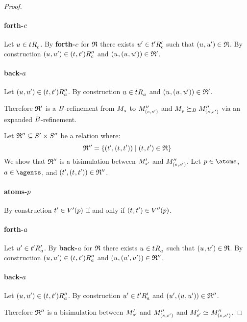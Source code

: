 \begin{proof}
\paragraph{forth-$c$}
Let $\kStateU \in \kSuccessorsC{\kStateT}$.
By {\bf forth-$c$} for $\mathfrak{R}$ there exists ${u}^{\prime} \in {{t}^{\prime}} {R^{\prime}_{c}}$ such that $(\kStateU, \kStateUP) \in \refinement$.
By construction $(\kStateU, \kStateUP) \in \kSuccessorsPPC{(\kStateT, \kStateTP)}$ and $(\kStateU, (\kStateU, \kStateUP)) \in \refinement'$.

\paragraph{back-$a$}
Let $(\kStateU, \kStateUP) \in \kSuccessorsPPA{(\kStateT, \kStateTP)}$.
By construction $\kStateU \in \kSuccessorsA{\kStateT}$ and $(\kStateU, (\kStateU, \kStateUP)) \in \refinement'$.

Therefore $\mathfrak{R}'$ is a $B$-refinement from $\kPModel{\kStateS}$ to $\kPModelPP{(\kStateS, \kStateSP)}$ and $\kPModel{\kStateS} \simulatesBs \kPModelPP{(\kStateS, \kStateSP)}$ via an expanded $B$-refinement.

Let $\mathfrak{R}'' \subseteq {S^{\prime}} \times {S^{\prime\prime}}$ be a relation where:
$$
\bisimulation'' = \{(\kStateTP, (\kStateT, \kStateTP)) \mid (\kStateT, \kStateTP) \in \refinement\}
$$
We show that $\mathfrak{R}''$ is a bisimulation between ${M^{\prime}_{{s}^{\prime}}}$ and $\kPModelPP{(\kStateS, \kStateSP)}$.
Let $\atomP \in \atoms$, $\agentA \in \agents$, and $(\kStateTP, (\kStateT, \kStateTP)) \in \bisimulation''$.

\paragraph{atoms-$p$}
By construction ${t}^{\prime} \in {V^{\prime}}(p)$ if and only if $(\kStateT, \kStateTP) \in \kValuationPP(\atomP)$.

\paragraph{forth-$a$}
Let ${u}^{\prime} \in {{t}^{\prime}} {R^{\prime}_{a}}$.
By {\bf back-$a$} for $\mathfrak{R}$ there exists $\kStateU \in \kSuccessorsA{\kStateT}$ such that $(\kStateU, \kStateUP) \in \refinement$.
By construction $(\kStateU, \kStateUP) \in \kSuccessorsPPA{(\kStateT, \kStateTP)}$ and $(\kStateU, (\kStateUP, \kStateUP)) \in \bisimulation''$.

\paragraph{back-$a$}
Let $(\kStateU, \kStateUP) \in \kSuccessorsPPA{(\kStateT, \kStateTP)}$.
By construction ${u}^{\prime} \in {{t}^{\prime}} {R^{\prime}_{a}}$ and $(\kStateUP, (\kStateU, \kStateUP)) \in \bisimulation''$.

Therefore $\mathfrak{R}''$ is a bisimulation between ${M^{\prime}_{{s}^{\prime}}}$ and $\kPModelPP{(\kStateS, \kStateSP)}$ and $\kPModelP{\kStateSP} \bisimilar \kPModelPP{(\kStateS, \kStateSP)}$.
\end{proof}

